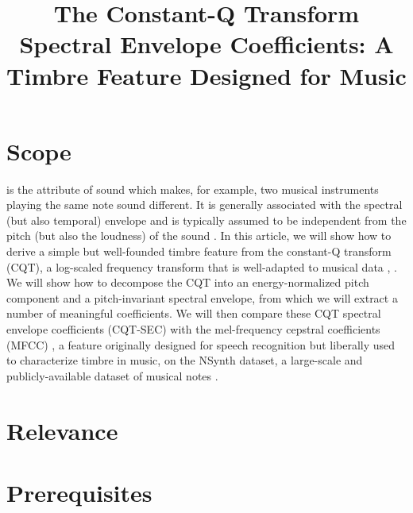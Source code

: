 \documentclass[journal]{IEEEtran}
\begin{document}
\title{The Constant-Q Transform Spectral Envelope Coefficients: A Timbre Feature Designed for Music}

\maketitle


\section{Scope}

 is the attribute of sound which makes, for example, two musical instruments playing the same note sound different. It is generally associated with the spectral (but also temporal) envelope and is typically assumed to be independent from the pitch (but also the loudness) of the sound \cite{moore2004}. In this article, we will show how to derive a simple but well-founded timbre feature from the constant-Q transform (CQT), a log-scaled frequency transform that is well-adapted to musical data \cite{brown1991}, \cite{brown1992}. We will show how to decompose the CQT into an energy-normalized pitch component and a pitch-invariant spectral envelope, from which we will extract a number of meaningful coefficients. We will then compare these CQT spectral envelope coefficients (CQT-SEC) with the mel-frequency cepstral coefficients (MFCC) \cite{davis1980}, a feature originally designed for speech recognition but liberally used to characterize timbre in music, on the NSynth dataset, a large-scale and publicly-available dataset of musical notes \cite{engel2017}.


\section{Relevance}







\section{Prerequisites}
\end{document}
